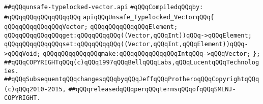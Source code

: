 \label{src/lib/std/src/unsafe/unsafe-typelocked-vector.api}
\verb|##qQQqunsafe-typelocked-vector.api|\newline
\newline
\verb|#qQQqCompiledqQQqby:|\newline
\verb|#qQQqqQQqqQQqqQQqqQQq|\newline
\newline
\newline
\verb|apiqQQqUnsafe_Typelocked_VectorqQQq{|\newline
\newline
\verb|qQQqqQQqqQQqqQQqVector;|\newline
\verb|qQQqqQQqqQQqqQQqElement;|\newline
\newline
\verb|qQQqqQQqqQQqqQQqget:qQQqqQQqqQQq((Vector,qQQqInt))qQQq->qQQqElement;|\newline
\verb|qQQqqQQqqQQqqQQqset:qQQqqQQqqQQq((Vector,qQQqInt,qQQqElement))qQQq->qQQqVoid;|\newline
\verb|qQQqqQQqqQQqqQQqmake:qQQqqQQqqQQqqQQqIntqQQq->qQQqVector;|\newline
\newline
\verb|};|\newline
\newline
\newline
\newline
\newline
\verb|##qQQqCOPYRIGHTqQQq(c)qQQq1997qQQqBellqQQqLabs,qQQqLucentqQQqTechnologies.|\newline
\verb|##qQQqSubsequentqQQqchangesqQQqbyqQQqJeffqQQqProtheroqQQqCopyrightqQQq(c)qQQq2010-2015,|\newline
\verb|##qQQqreleasedqQQqperqQQqtermsqQQqofqQQqSMLNJ-COPYRIGHT.|\newline

